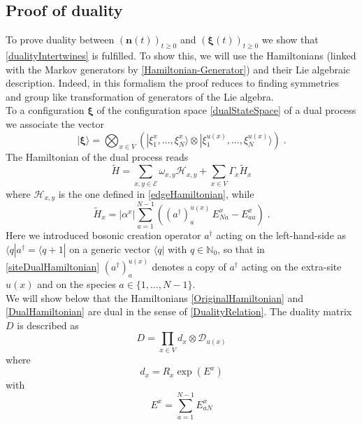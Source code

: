 \documentclass[10pt]{article}
\numberwithin{equation}{section}
\numberwithin{equation}{subsection}
\newcommand{\dt}{\;.}
\newcommand{\dd}{\mathcal{D}_{u(x)}}
\begin{document}
\subsection{Proof of duality}
To prove duality between $(\bm{n}(t))_{t\geq 0}$ and $(\bm{\xi}(t))_{t\geq 0}$ we  show that \eqref{dualityIntertwines} is fulfilled.  To show this, we will use the Hamiltonians (linked with the Markov generators by \eqref{Hamiltonian-Generator}) and their Lie algebraic description. Indeed, in this formalism the proof reduces to finding symmetries and group like transformation of generators of the Lie algebra.\\
To a configuration $\bm{\xi}$ of the configuration space  \eqref{dualStateSpace} of a dual process we associate the vector
\begin{equation}
    |\bm{\xi}\rangle=\bigotimes_{x\in V}\left(|\xi_{1}^{x},\ldots,\xi_{N}^{x}\rangle\otimes |\xi_{1}^{u(x)},\ldots,\xi_{N}^{u(x)}\rangle\right)\dt
\end{equation}
The Hamiltonian of the dual process reads
\begin{equation}\label{DualHamiltonian}
    \widetilde{H}=\sum_{x,y\in \mathcal{E}}\omega_{x,y}\mathcal{H}_{x,y}+\sum_{x\in V}\Gamma_{x}\widetilde{H}_{x}
\end{equation}
where $\mathcal{H}_{x,y}$ is the one defined in \eqref{edgeHamiltonian}, while 
\begin{equation}\label{siteDualHamiltonian}
    \widetilde{H}_{x}=|\alpha^{x}|\sum_{a=1}^{N-1}\left((a^{\dagger})_{a}^{u(x)}\,E_{Na}^{x}-E_{aa}^{x}\right)\dt
\end{equation}
Here we introduced bosonic creation operator $a^{\dagger}$ acting on the left-hand-side as $\langle q|a^{\dagger}=\langle q+1|$ on a generic vector $\langle q|$ with $q\in \mathbb{N}_{0}$, so that in \eqref{siteDualHamiltonian} 
$(a^{\dagger})_{a}^{u(x)}$ denotes a copy of $a^{\dagger}$ acting on the extra-site $u(x)$ and on the species $a\in\{1,\ldots,N-1\}$. \\
We will show below that the Hamiltonians \eqref{OriginalHamiltonian} and \eqref{DualHamiltonian} are dual in the sense of \eqref{DualityRelation}. The duality matrix $D$ is described as 
\begin{equation}\label{dualityMatrix}
    D=\prod_{x\in V}d_{x}\otimes \dd
\end{equation}
where
\begin{equation}\label{bulkElementDualityMatrix}
d_{x}=R_{x}\exp{(E^{x})}
\end{equation}
with 
\begin{equation}\label{EquationEx}
E^{x}=\sum_{a=1}^{N-1}E_{aN}^{x}
\end{equation}
\end{document}
